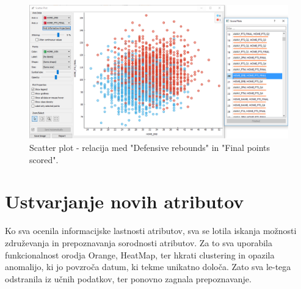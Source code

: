 \documentclass[a4paper,11pt]{article}
\begin{document}
\begin{figure}[H]
\begin{center}
\includegraphics[scale=0.3]{OC_DRB_PTS-FINAL.png}
\caption{Scatter plot - relacija med "Defensive rebounds" in "Final points scored".}
\label{slika2.1}
\end{center}
\end{figure} 


\section{Ustvarjanje novih atributov}

Ko sva ocenila informacijske lastnosti atributov, sva se lotila iskanja možnosti združevanja 
in prepoznavanja sorodnosti atributov. Za to sva uporabila funkcionalnost orodja Orange,
HeatMap, ter hkrati clustering in opazila anomalijo, ki jo povzroča datum, ki tekme unikatno
 določa. Zato sva le-tega odstranila iz učnih podatkov, ter ponovno zagnala prepoznavanje.\\
\end{document}
